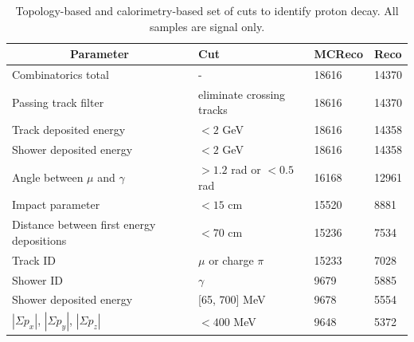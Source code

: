 \documentclass[a4paper, 10pt]{article}
\begin{document}
\begin{table}[!htbp]
\centering
\caption{Topology-based and calorimetry-based set of cuts to identify proton decay. All samples are signal only.}
\begin{centering}
\begin{tabular}{|l|l|l|l|}
\hline
\multicolumn{1}{|c|}{{\bf Parameter}}    & {\bf Cut}      & {\bf MCReco} & {\bf Reco} \\ \hline
Combinatorics total                                          & -                                       & 18616                      & 14370       \\ \hline
Passing track filter                                            &  eliminate crossing tracks   & 18616               & 14370       \\ \hline
Track deposited energy                                   & $< 2$ GeV                     & 18616               & 14358       \\ \hline
Shower deposited energy                               & $< 2$ GeV                     & 18616               & 14358        \\ \hline
Angle between $\mu$ and $\gamma$          & $> 1.2$ rad or $<0.5$ rad       & 16168  & 12961        \\ \hline
Impact parameter                                              & $< 15$ cm                     & 15520                 & 8881        \\ \hline
Distance between first energy depositions  & $< 70$ cm                     & 15236                 & 7534        \\ \hline
Track ID                                                                & $\mu$ or charge $\pi$ & 15233               & 7028       \\ \hline
Shower ID                                                           & $\gamma$                     & 9679               & 5885         \\ \hline
Shower deposited energy                               & {[}65, 700{]} MeV          & 9678               & 5554         \\ \hline
$|\Sigma p_x|$, $|\Sigma p_y|$, $|\Sigma p_z|$ & $< 400$ MeV       & 9648               & 5372         \\ \hline
\end{tabular}
\end{centering}
\label{T3}
\end{table}
\end{document}

